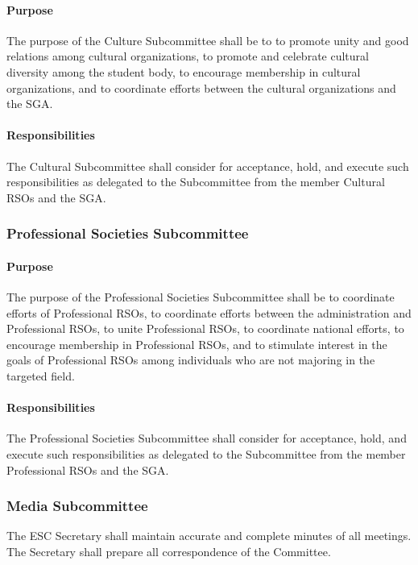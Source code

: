 \documentclass[12pt]{scrreprt}
\begin{document}
\paragraph{Purpose}
The purpose of the Culture Subcommittee shall be to to promote unity and good relations among cultural organizations, to promote and celebrate cultural diversity
among the student body, to encourage membership in cultural organizations, and to coordinate efforts between the cultural organizations and the SGA.

\paragraph{Responsibilities}
The Cultural Subcommittee shall consider for acceptance, hold, and
execute such responsibilities as delegated to the Subcommittee from the member Cultural RSOs and the SGA.

\subsubsection{Professional Societies Subcommittee}

\paragraph{Purpose}
​The purpose of the Professional Societies Subcommittee shall be to coordinate
efforts of Professional RSOs, to coordinate efforts between the administration and
Professional RSOs, to unite Professional RSOs, to coordinate national efforts, to encourage
membership in Professional RSOs, and to stimulate interest in the goals of Professional
RSOs among individuals who are not majoring in the targeted field.


\paragraph{Responsibilities}
The Professional Societies Subcommittee shall consider for
acceptance, hold, and execute such responsibilities as delegated to the Subcommittee from
the member Professional RSOs and the SGA.

\subsubsection{Media Subcommittee}
The ESC Secretary shall maintain accurate and complete minutes of all
meetings. The Secretary shall prepare all correspondence of the Committee.
\end{document}
